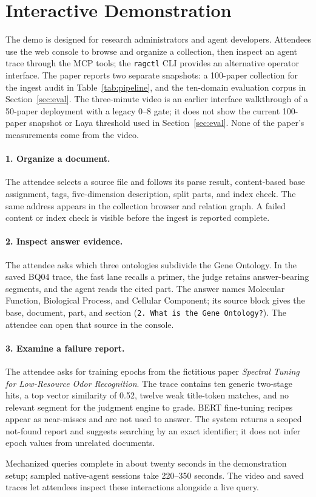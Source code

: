 \section{Interactive Demonstration}
\label{sec:demo}

The demo is designed for research administrators and agent developers.
Attendees use the web console to browse and organize a collection, then
inspect an agent trace through the MCP tools; the \texttt{ragctl} CLI
provides an alternative operator interface. The paper reports two
separate snapshots: a 100-paper collection for the ingest audit in
Table~\ref{tab:pipeline}, and the ten-domain evaluation corpus in
Section~\ref{sec:eval}. The three-minute video is an earlier interface
walkthrough of a 50-paper deployment with a legacy 0--8 gate; it does not
show the current 100-paper snapshot or Laya threshold used in Section~\ref{sec:eval}.
None of the paper's measurements come from the video.

\paragraph{1. Organize a document.}
The attendee selects a source file and follows its parse result,
content-based base assignment, tags, five-dimension description, split
parts, and index check. The same address appears in the collection
browser and relation graph. A failed content or index check is visible
before the ingest is reported complete.

\paragraph{2. Inspect answer evidence.}
The attendee asks which three ontologies subdivide the Gene Ontology.
In the saved BQ04 trace, the fast lane recalls a primer, the judge retains
answer-bearing segments, and the agent reads the cited part. The answer
names Molecular Function, Biological Process, and Cellular Component;
its source block gives the base, document, part, and section
(\texttt{2. What is the Gene Ontology?}). The attendee can open that
source in the console.

\paragraph{3. Examine a failure report.}
The attendee asks for training epochs from the fictitious paper
\emph{Spectral Tuning for Low-Resource Odor Recognition}. The trace
contains ten generic two-stage hits, a top vector similarity of 0.52,
twelve weak title-token matches, and no relevant segment for the
judgment engine to grade. BERT fine-tuning recipes appear as near-misses
and are not used to answer. The system returns a scoped not-found report
and suggests searching by an exact identifier; it does not infer epoch
values from unrelated documents.

Mechanized queries complete in about twenty seconds in the demonstration
setup; sampled native-agent sessions take 220--350 seconds. The video
and saved traces let attendees inspect these interactions alongside a
live query.
